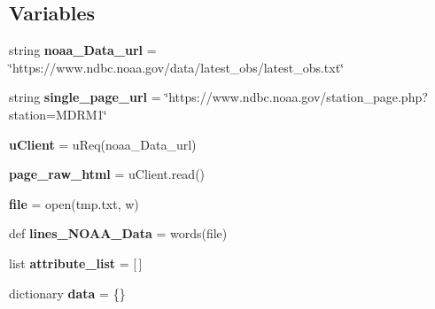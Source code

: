 \subsection*{Variables}
\begin{DoxyCompactItemize}
\item 
\mbox{\label{namespacescrape___n_o_a_a__buoy_a13231aceb490b34c59a3ff93ef1f3683}} 
string {\bfseries noaa\+\_\+\+Data\+\_\+url} = \char`\"{}https\+://www.\+ndbc.\+noaa.\+gov/data/latest\+\_\+obs/latest\+\_\+obs.\+txt\char`\"{}
\item 
\mbox{\label{namespacescrape___n_o_a_a__buoy_ad05b5be8214b4f2f095a94d7eb589c14}} 
string {\bfseries single\+\_\+page\+\_\+url} = \char`\"{}https\+://www.\+ndbc.\+noaa.\+gov/station\+\_\+page.\+php?station=M\+D\+R\+M1\char`\"{}
\item 
\mbox{\label{namespacescrape___n_o_a_a__buoy_a1c324eb194befae4063a7872336f06f7}} 
{\bfseries u\+Client} = u\+Req(noaa\+\_\+\+Data\+\_\+url)
\item 
\mbox{\label{namespacescrape___n_o_a_a__buoy_a03665f0d0faa2bc42bb808ad824ad6e9}} 
{\bfseries page\+\_\+raw\+\_\+html} = u\+Client.\+read()
\item 
\mbox{\label{namespacescrape___n_o_a_a__buoy_ad178ab153214f14621228a7f719f0f7c}} 
{\bfseries file} = open(\textquotesingle{}tmp.\+txt\textquotesingle{}, \textquotesingle{}w\textquotesingle{})
\item 
\mbox{\label{namespacescrape___n_o_a_a__buoy_a4fcbe090ba99971fef19beafb1a59a31}} 
def {\bfseries lines\+\_\+\+N\+O\+A\+A\+\_\+\+Data} = words(file)
\item 
\mbox{\label{namespacescrape___n_o_a_a__buoy_ad05b95e4046291707dcfdf9e3b9451ad}} 
list {\bfseries attribute\+\_\+list} = \mbox{[}$\,$\mbox{]}
\item 
\mbox{\label{namespacescrape___n_o_a_a__buoy_a208ab0f0e1e7dff400c7f4342f71a22b}} 
dictionary {\bfseries data} = \{\}
\item 

\end{DoxyCompactItemize}
